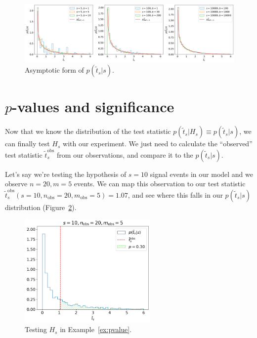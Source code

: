 \begin{figure}[htb]
\centering
\includegraphics[width=\textwidth]{figures/02-hypothesis-testing/2.png}
\captionsetup{justification=centering}
\caption{Asymptotic form of $p(\tilde{t}_s|s)$.}
\label{fig:p_tilde_t_asym}
\end{figure}

\section{\texorpdfstring{$p$-values}{p-values} and significance}
\label{sec:significance}

Now that we know the distribution of the test statistic $p(\tilde{t}_s|H_s) \equiv p(\tilde{t}_s|s)$, we can finally test $H_s$ with our experiment.
We just need to calculate the ``observed'' test statistic $\tilde{t}^{\mathrm{obs}}_s$ from our observations, and compare it to the $p(\tilde{t}_s|s)$.

\begin{example}
\label{ex:pvalue}
Let's say we're testing the hypothesis of $s = 10$ signal events in our model and we observe $n = 20, m = 5$ events.
We can map this observation to our test statistic $\tilde{{t}}^{\mathrm{{obs}}}_s(s = 10, n_{\mathrm{obs}} = 20, m_{\mathrm{obs}} = 5) = 1.07$,
and see where this falls in our $p(\tilde{t}_s|s)$ distribution (Figure~\ref{fig:Hs}).
\end{example}

\begin{figure}[htb]
\centering
\includegraphics[width=0.6\textwidth]{figures/02-hypothesis-testing/3.png}
\captionsetup{justification=centering}
\caption{Testing $H_s$ in Example~\ref{ex:pvalue}.}
\label{fig:Hs}
\end{figure}

